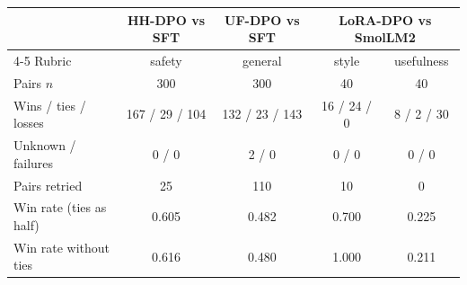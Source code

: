 \begin{tabular}{l c c c c}
\toprule
 & HH-DPO vs SFT & UF-DPO vs SFT & \multicolumn{2}{c}{LoRA-DPO vs SmolLM2} \\
\cmidrule(lr){4-5}
Rubric & safety & general & style & usefulness \\
\midrule
Pairs $n$ & 300 & 300 & 40 & 40 \\
Wins / ties / losses & 167 / 29 / 104 & 132 / 23 / 143 & 16 / 24 / 0 & 8 / 2 / 30 \\
Unknown / failures & 0 / 0 & 2 / 0 & 0 / 0 & 0 / 0 \\
Pairs retried & 25 & 110 & 10 & 0 \\
Win rate (ties as half) & 0.605 & 0.482 & 0.700 & 0.225 \\
Win rate without ties & 0.616 & 0.480 & 1.000 & 0.211 \\
\bottomrule
\end{tabular}
